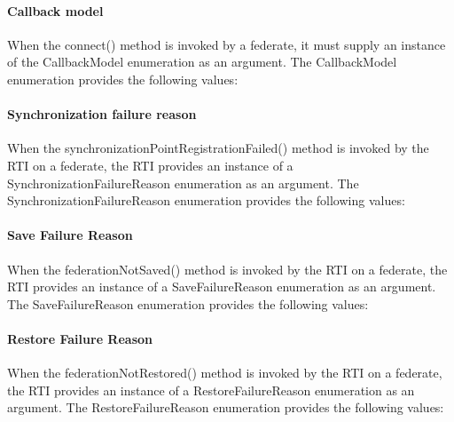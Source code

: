 \begin{compactstdpage}
    \paragraph{Callback model}

    When the connect() method is invoked by a federate, it must supply an instance of the CallbackModel enumeration as an argument. The CallbackModel enumeration provides the following values:


    \paragraph{Synchronization failure reason}

    When the synchronizationPointRegistrationFailed() method is invoked by the RTI on a federate, the RTI provides an instance of a SynchronizationFailureReason enumeration as an argument. The SynchronizationFailureReason enumeration provides the following values:


    \paragraph{Save Failure Reason}

    When the federationNotSaved() method is invoked by the RTI on a federate, the RTI provides an instance of a SaveFailureReason enumeration as an argument. The SaveFailureReason enumeration provides the following values:


    \paragraph{Restore Failure Reason}

    When the federationNotRestored() method is invoked by the RTI on a federate, the RTI provides an instance of a RestoreFailureReason enumeration as an argument. The RestoreFailureReason enumeration provides the following values:


\end{compactstdpage}
